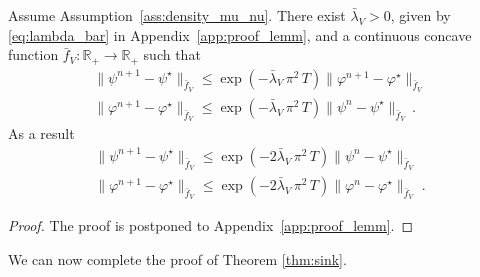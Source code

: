 \documentclass[final,12pt]{colt2023} %
\def\rset{\mathbb{R}}
\newcommand{\be}{\begin{equation}}
\newcommand{\ee}{\end{equation}}
\def\rset{\mathbb{R}}
\def\eqsp{\;}
\def\varphistar{\varphi^\star}
\def\psistar{\psi^{\star}}
\def\blambda{\bar{\lambda}}
\def\blambdaV{\blambda_V}
\begin{document}
\begin{lemma}\label{lemma:diff:lip}
  Assume Assumption~\ref{ass:density_mu_nu}. 
There exist $\blambdaV >0$, given by \eqref{eq:lambda_bar} in Appendix~\ref{app:proof_lemm}, and a continuous concave function $\bar f_V :\rset_+ \to \rset_+$ such that 
\be\label{eq:grad_exp_2}
\begin{split}
    \|\psi^{n+1}-\psistar\|_{\bar f_V}\leq  \exp(-\blambdaV \,\pi^2\,T)\| \varphi^{n+1}-\varphistar\|_{\bar f_V}\\
\|\varphi^{n+1}-\varphistar\|_{\bar f_V}\leq  \exp(-\blambdaV\,\pi^2\, T)\| \psi^{n}-\psistar\|_{\bar f_V}\,.
\end{split}
\ee
As a result
\be\label{eq:grad_exp_3}
\begin{split}
\|\psi^{n+1}-\psistar\|_{\bar f_V}\leq  \exp(-2\blambdaV \,\pi^2\,T)\| \psi^{n}-\psistar\|_{\bar f_V}\\
\|\varphi^{n+1}-\varphistar\|_{\bar f_V}\leq  \exp(-2\blambdaV \,\pi^2\,T)\| \varphi^{n}-\varphistar\|_{\bar f_V} \eqsp.
\end{split}
\ee
\end{lemma}
\begin{proof}
  The proof is postponed to Appendix~\ref{app:proof_lemm}.
\end{proof}




We can now complete the proof of Theorem \ref{thm:sink}.\\
\end{document}
